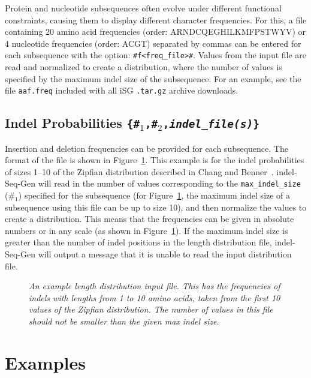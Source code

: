 \documentclass[10pt]{article}
\begin{document}
Protein and nucleotide subsequences often evolve under different functional constraints, causing them to display different character frequencies. For this, a file containing 20 amino acid frequencies (order: ARNDCQEGHILKMFPSTWYV) or 4 nucleotide frequencies (order: ACGT) separated by commas can be entered for each subsequence with the option:
\verb+#f<freq_file>#+.  Values from the input file are read and normalized to create a
distribution, where the number of values is specified by the maximum indel size of the
subsequence. For an example, see the file {\tt aaf.freq} included with all iSG {\tt .tar.gz} archive downloads.

\subsection{Indel Probabilities {\tt \{\#$_1$,\#$_2$,{\it indel\_file(s)}\}}}

Insertion and deletion frequencies can be provided for each subsequence.  The format of the file is shown in Figure~\ref{fig:zipf}.  This example is for the indel probabilities of sizes 1--10 of the Zipfian distribution described in Chang and Benner~\cite{Chang04}.
indel-Seq-Gen will read in the number of values corresponding to the {\tt max\_indel\_size} (\#$_1$) specified for the subsequence (for Figure~\ref{fig:zipf}, the maximum indel size of a subsequence using this file can be up to size 10), and then normalize the values to create a distribution.  This means that the frequencies can be given in absolute numbers or in any scale (as shown in Figure~\ref{fig:zipf}).  If the maximum indel size is greater than the number of indel positions in the length distribution file, indel-Seq-Gen will output a message that it is unable to read the input distribution file.

\begin{figure}[htbp]
\centering
{}
\caption{\textit{An example length distribution input file.  This has the frequencies of indels with lengths from 1 to 10 amino acids, taken from the first 10 values of the Zipfian distribution.  The number of values in this file should not be smaller than the given max indel size.}}
\label{fig:zipf}
\end{figure}

\section{Examples}
\label{sec:example}
\end{document}
